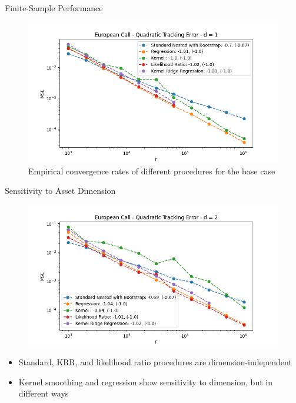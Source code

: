 \documentclass[9pt,handout]{beamer}
\begin{document}
\begin{frame}{Finite-Sample Performance}

\begin{figure}
    \includegraphics[width=\textwidth]{../project1/figures/figure1.png}
    \caption{Empirical convergence rates of different procedures for the base case}
\end{figure}

\end{frame}

\begin{frame}{Sensitivity to Asset Dimension}

\begin{figure}
    \includegraphics[width=\textwidth]{../project1/figures/figure2a.png}
\end{figure}

\begin{itemize}
    \item Standard, KRR, and likelihood ratio procedures are dimension-independent
    \item Kernel smoothing and regression show sensitivity to dimension, but in different ways
\end{itemize}

\end{frame}
\end{document}
